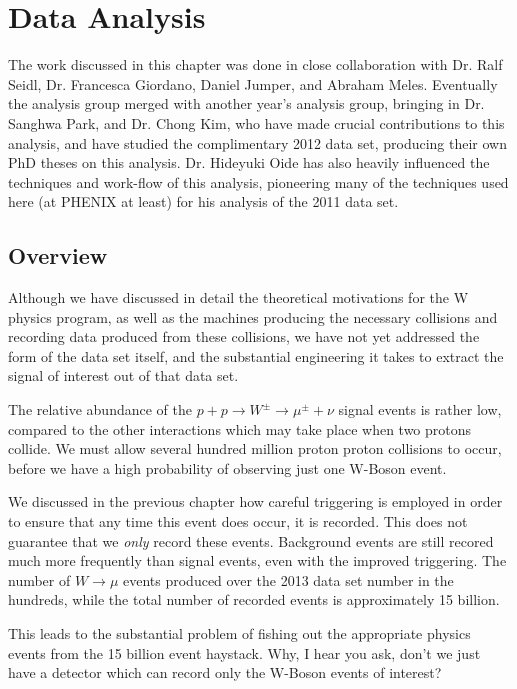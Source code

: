 \chapter{Data Analysis}
\label{ch:data_analysis}
The work discussed in this chapter was done in close collaboration with Dr. Ralf
Seidl, Dr. Francesca Giordano, Daniel Jumper, and Abraham Meles. Eventually the
analysis group merged with another year's analysis group, bringing in Dr. Sanghwa
Park, and Dr. Chong Kim, who have made crucial contributions to this analysis,
and have studied the complimentary 2012 data set, producing their own PhD theses
on this analysis. Dr. Hideyuki Oide has also heavily influenced the techniques
and work-flow of this analysis, pioneering many of the techniques used here (at
PHENIX at least) for his analysis of the 2011 data set.

\label{ch:data_collection}
\section{Overview}
Although we have discussed in detail the theoretical motivations for the W
physics program, as well as the machines producing the necessary collisions and
recording data produced from these collisions, we have not yet addressed the
form of the data set itself, and the substantial engineering it takes to extract
the signal of interest out of that data set.

The relative abundance of the $p + p \rightarrow W^\pm \rightarrow \mu^\pm +
\nu$ signal events is rather low, compared to the other interactions which may
take place when two protons collide. We must allow several hundred million
proton proton collisions to occur, before we have a high probability of
observing just one W-Boson event. 

We discussed in the previous chapter how careful triggering is employed in order
to ensure that any time this event does occur, it is recorded. This does not
guarantee that we \textit{only} record these events. Background events are still
recored much more frequently than signal events, even with the improved
triggering. The number of $W\rightarrow\mu$ events produced over the 2013 data
set number in the hundreds, while the total number of recorded events is
approximately 15 billion.

This leads to the substantial problem of fishing out the appropriate physics
events from the 15 billion event haystack. Why, I hear you ask, don't we just
have a detector which can record only the W-Boson events of interest?


